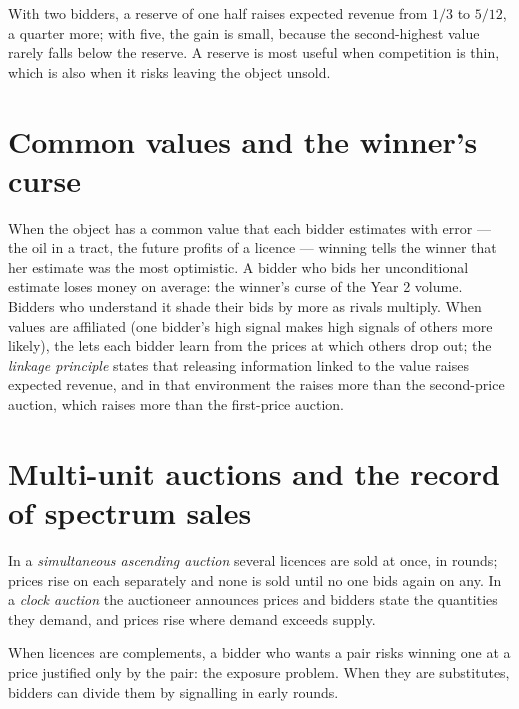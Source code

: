 With two bidders, a reserve of one half raises expected revenue from $1/3$ to $5/12$, a quarter more;
with five, the gain is small, because the second-highest value rarely falls below the
reserve. A reserve is most useful when competition is thin, which is also when it
risks leaving the object unsold.

\section{Common values and the winner's curse}\label{sec:b3:auctions-and-market-design:common}

When the object has a common value that each bidder estimates with error --- the oil
in a tract, the future profits of a licence --- winning tells the winner that her
estimate was the most optimistic. A bidder who bids her unconditional estimate
loses money on average: the winner's curse of the Year 2 volume. Bidders who
understand it shade their bids by more as rivals multiply. When values are
affiliated (one bidder's high signal makes high signals of others more likely), the
 lets each bidder learn from the prices at which others drop out;
the \emph{linkage principle} states that releasing information linked to the value
raises expected revenue, and in that environment the  raises more
than the second-price auction, which raises more than the first-price auction.

\section{Multi-unit auctions and the record of spectrum sales}\label{sec:b3:auctions-and-market-design:spectrum}

\begin{definition}\label{def:b3:auctions-and-market-design:multi-unit}
In a \emph{simultaneous ascending auction} several licences are sold at once, in rounds;
prices rise on each separately and none is sold until no one bids again on any. In a
\emph{clock auction} the auctioneer announces prices and bidders state the quantities
they demand, and prices rise where demand exceeds supply.
\end{definition}

When licences are complements, a bidder who wants a pair risks winning one at a
price justified only by the pair: the exposure problem. When they are substitutes,
bidders can divide them by signalling in early rounds.

